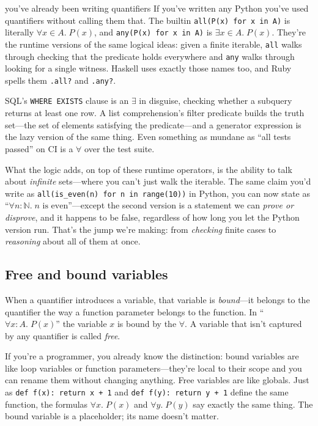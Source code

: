 \documentclass[11pt]{article}
\begin{document}
\begin{sidebar}{you've already been writing quantifiers}
If you've written any Python you've used quantifiers without calling them that. The builtin \texttt{all(P(x) for x in A)} is literally $\forall x \in A.\; P(x)$, and \texttt{any(P(x) for x in A)} is $\exists x \in A.\; P(x)$. They're the runtime versions of the same logical ideas: given a finite iterable, \texttt{all} walks through checking that the predicate holds everywhere and \texttt{any} walks through looking for a single witness. Haskell uses exactly those names too, and Ruby spells them \texttt{.all?} and \texttt{.any?}.

SQL's \texttt{WHERE EXISTS} clause is an $\exists$ in disguise, checking whether a subquery returns at least one row. A list comprehension's filter predicate builds the truth set---the set of elements satisfying the predicate---and a generator expression is the lazy version of the same thing. Even something as mundane as ``all tests passed'' on CI is a $\forall$ over the test suite.

What the logic adds, on top of these runtime operators, is the ability to talk about \emph{infinite} sets---where you can't just walk the iterable. The same claim you'd write as \texttt{all(is\_even(n) for n in range(10))} in Python, you can now state as ``$\forall n : \mathbb{N}.\; n \text{ is even}$''---except the second version is a statement we can \emph{prove or disprove}, and it happens to be false, regardless of how long you let the Python version run. That's the jump we're making: from \emph{checking} finite cases to \emph{reasoning} about all of them at once.
\end{sidebar}

\subsection{Free and bound variables}
When a quantifier introduces a variable, that variable is \emph{bound}---it belongs to the quantifier the way a function parameter belongs to the function. In ``$\forall x : A.\; P(x)$'' the variable $x$ is bound by the $\forall$. A variable that isn't captured by any quantifier is called \emph{free}.

If you're a programmer, you already know the distinction: bound variables are like loop variables or function parameters---they're local to their scope and you can rename them without changing anything. Free variables are like globals. Just as \texttt{def f(x): return x + 1} and \texttt{def f(y): return y + 1} define the same function, the formulas $\forall x.\; P(x)$ and $\forall y.\; P(y)$ say exactly the same thing. The bound variable is a placeholder; its name doesn't matter.
\end{document}
